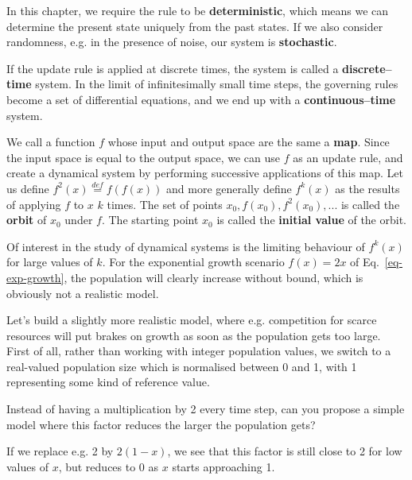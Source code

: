 In this chapter, we require the rule to be \textbf{deterministic}, which means we can determine the present state uniquely from the past states. If we also consider randomness, e.g. in the presence of noise, our system is \textbf{stochastic}.

If the update rule is applied at discrete times, the system is called a \textbf{discrete--time} system. In the limit of infinitesimally small time steps, the governing rules become a set of differential equations, and we end up with a \textbf{continuous--time} system.

\pagebreak


We call a function $f$ whose input and output space are the same a \textbf{map}. Since the input space is equal to the output space, we can use $f$ as an update rule, and create a dynamical system by performing successive applications of this map. Let us define $f^2(x) \stackrel{def}{=} f(f(x))$ and more generally define $f^k(x)$ as the results of applying $f$ to $x$ $k$ times. \noindent{} The set of points ${x_0, f(x_0), f^2(x_0), ...}$ is called the \textbf{orbit} of $x_0$ under $f$. The starting point $x_0$ is called the \textbf{initial value} of the orbit.

Of interest in the study of dynamical systems is the limiting behaviour of $f^k(x)$ for large values of $k$. For the exponential growth scenario $f(x)=2x$ of Eq.~\ref{eq-exp-growth}, the population will clearly increase without bound, which is obviously not a realistic model.

Let's build a slightly more realistic model, where e.g. competition for scarce resources will put brakes on growth as soon as the population gets too large. First of all, rather than working with integer population values, we switch to a real-valued population size which is normalised between 0 and 1, with 1 representing some kind of reference value. 

\begin{cue}
Instead of having a multiplication by 2 every time step, can you propose a simple model where this factor reduces the larger the population gets? 
\end{cue}

If we replace e.g. 2 by $2(1-x)$, we see that this factor is still close to 2 for low values of $x$, but reduces to 0 as $x$ starts approaching 1.

